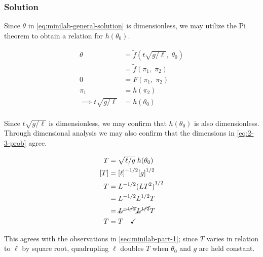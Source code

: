 \documentclass[12pt,twoside]{article}
\begin{document}
  \subsubsection*{Solution}

  Since $\theta$ in \cref{eq:minilab-general-solution} is dimensionless, we may
  utilize the Pi theorem to obtain a relation for $h(\theta_0)$.

  \begin{equation}
    \begin{aligned}
      \theta &= \tilde{f}(t\sqrt{g/\ell},\;\theta_0) \\
      &= \tilde{f}(\pi_1,\;\pi_2) \\
      0 &= F(\pi_1,\;\pi_2) \\
      \pi_1 &= h(\pi_2) \\
      \implies t\sqrt{g/\ell} &= h(\theta_0) \\
    \end{aligned}
  \end{equation}

  Since $t\sqrt{g/\ell}$ is dimensionless, we may confirm that $h(\theta_0)$ is
  also dimensionless. Through dimensional analysis we may also confirm that the
  dimensions in \cref{eq:2-3-prob} agree.

  \begin{equation}
    \begin{aligned}
      T &= \sqrt{\ell/g}\;h(\theta_0) \\
      [T] &= {[\ell]}^{-1/2}{[g]}^{1/2} \\
      T &= L^{-1/2}{(LT^2)}^{1/2} \\
      &= L^{-1/2}L^{1/2}T \\
      &= \cancel{L^{-1/2}}\cancel{L^{1/2}}T \\
      T &= T \quad\checkmark
    \end{aligned}
  \end{equation}

  This agrees with the observations in \cref{sec:minilab-part-1}; since $T$
  varies in relation to $\ell$ by square root, quadrupling $\ell$ doubles $T$
  when $\theta_0$ and $g$ are held constant.
\end{document}
